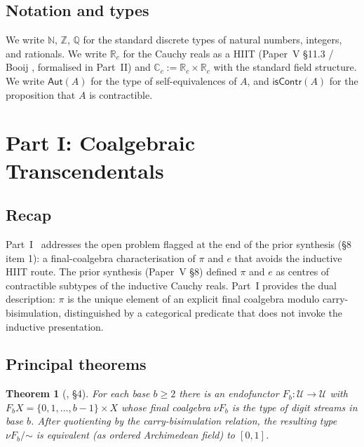 \documentclass[12pt]{article}
\newtheorem{theorem}{Theorem}[section]
\theoremstyle{definition}
\theoremstyle{remark}
\newcommand{\Type}{\mathcal{U}}
\newcommand{\N}{\mathbb{N}}
\newcommand{\Z}{\mathbb{Z}}
\newcommand{\Q}{\mathbb{Q}}
\newcommand{\R}{\mathbb{R}}
\newcommand{\C}{\mathbb{C}}
\newcommand{\Rc}{\R_{c}}
\newcommand{\Cc}{\C_{c}}
\newcommand{\isContr}{\mathsf{isContr}}
\newcommand{\bisim}{\mathrel{\sim}}
\newcommand{\Aut}{\mathsf{Aut}}
\begin{document}
\subsection{Notation and types}

We write $\N$, $\Z$, $\Q$ for the standard discrete types of natural
numbers, integers, and rationals. We write $\Rc$ for the Cauchy reals as
a HIIT (Paper~V \S 11.3 / Booij \cite{Booij2020}, formalised in Part~II)
and $\Cc := \Rc \times \Rc$ with the standard field structure. We write
$\Aut(A)$ for the type of self-equivalences of $A$, and $\isContr(A)$ for
the proposition that $A$ is contractible.

\section{Part I: Coalgebraic Transcendentals}\label{sec:partI}

\subsection{Recap}

Part~I~\cite{coalgebraicTranscendentals} addresses the open problem flagged
at the end of the prior synthesis (\S 8 item 1): a final-coalgebra
characterisation of $\pi$ and $e$ that avoids the inductive HIIT route. The
prior synthesis (Paper~V \S 8) defined $\pi$ and $e$ as centres of
contractible subtypes of the inductive Cauchy reals. Part~I provides the
dual description: $\pi$ is the unique element of an explicit final coalgebra
modulo carry-bisimulation, distinguished by a categorical predicate that
does not invoke the inductive presentation.

\subsection{Principal theorems}

\begin{theorem}[\cite{coalgebraicTranscendentals}, \S 4]
For each base $b \geq 2$ there is an endofunctor $F_b : \Type \to \Type$
with $F_b X = \{0,1,\dots,b-1\} \times X$ whose final coalgebra $\nu F_b$
is the type of digit streams in base $b$. After quotienting by the
\emph{carry-bisimulation} relation, the resulting type
$\nu F_b / \mathord{\bisim}$ is equivalent (as ordered Archimedean field)
to $[0,1]$.
\end{theorem}
\end{document}
